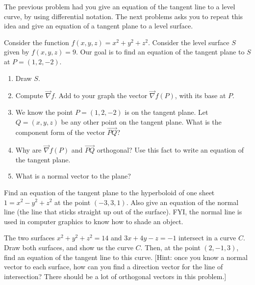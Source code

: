 The previous problem had you give an equation of the tangent line to a level curve, by using differential notation.  The next problems asks you to repeat this idea and give an equation of a tangent plane to a level surface.
\begin{problem}
 Consider the function $f(x,y,z)=x^2+y^2+z^2$.  Consider the level surface $S$ given by $f(x,y,z)=9$. Our goal is to find an equation of the tangent plane to $S$ at $P=(1,2,-2)$.
 \begin{enumerate}
  \item Draw $S$.
  \item Compute $\vec \nabla f$. Add to your graph the vector $\vec \nabla f(P)$, with its base at $P$. 
  \item We know the point $P=(1,2,-2)$ is on the tangent plane. Let $Q=(x,y,z)$ be any other point on the tangent plane.  What is the component form of the vector $\vec {PQ}$?
  \item Why are  $\vec \nabla f(P)$ and $\vec{PQ}$ orthogonal? Use this fact to write an equation of the tangent plane.
  \item What is a normal vector to the plane?
 \end{enumerate}
\end{problem}

\begin{problem}
 Find an equation of the tangent plane to the hyperboloid of one sheet $1=x^2-y^2+z^2$ at the point $(-3,3,1)$. Also give an equation of the normal line (the line that sticks straight up out of the surface).  FYI, the normal line is used in computer graphics to know how to shade an object.  
\end{problem}

\begin{problem}
 The two surfaces $x^2+y^2+z^2=14$ and $3x+4y-z=-1$ intersect in a curve $C$. Draw both surfaces, and show us the curve $C$. Then, at the point $(2,-1,3)$, find an equation of the tangent line to this curve. [Hint: once you know a normal vector to each surface, how can you find a direction vector for the line of intersection? There should be a lot of orthogonal vectors in this problem.]
\end{problem}


